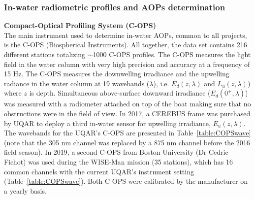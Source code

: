 \documentclass[essd, manuscript]{copernicus}
\begin{document}
\subsubsection{In-water radiometric profiles and AOPs determination}

\textbf{Compact-Optical Profiling System (C-OPS)}\\
The main instrument used to determine in-water AOPs, common to all projects, is the C-OPS (Biospherical Instruments)\citep{Hooker2013, Morrow2010}. All together, the data set contains 216 different stations totalizing $\sim$1000 C-OPS profiles. The C-OPS measures the light field in the water column with very high precision and accuracy at a frequency of 15 Hz. The C-OPS  measures the downwelling irradiance and the upwelling radiance in the water column at 19 wavebands ($\lambda$), i.e. $E_d(z,\lambda)$ and  $L_u(z,\lambda)$) where $z$ is depth. Simultaneous above-surface downward irradiance ($E_d(0^+, \lambda)$) was measured with a radiometer attached on top of the boat making sure that no obstructions were in the field of view. In 2017, a CEREBUS frame was purchased by UQAR to deploy a third in-water sensor for upwelling irradiance, $E_u(z,\lambda)$. The wavebands for the UQAR's C-OPS are presented in Table~\ref{table:COPSwave} (note that the 305 nm channel was replaced by a 875 nm channel before the 2016 field season).  In 2019, a second C-OPS from Boston University (Dr Cedric Fichot) was used during the WISE-Man mission (35 stations), which has 16 common channels with the current UQAR's instrument setting (Table~\ref{table:COPSwave}). Both C-OPS were calibrated by the manufacturer on a yearly basis. 
\end{document}
